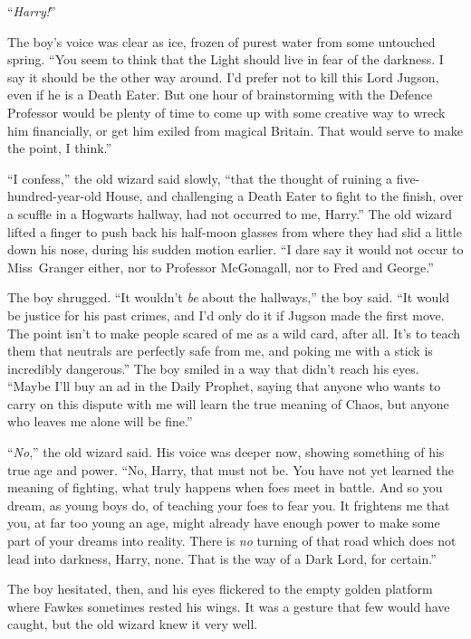 “\emph{Harry!}”

The boy’s voice was clear as ice, frozen of purest water from some untouched spring. “You seem to think that the Light should live in fear of the darkness. I say it should be the other way around. I’d prefer not to kill this Lord Jugson, even if he is a Death Eater. But one hour of brainstorming with the Defence Professor would be plenty of time to come up with some creative way to wreck him financially, or get him exiled from magical Britain. That would serve to make the point, I think.”

“I confess,” the old wizard said slowly, “that the thought of ruining a five-hundred-year-old House, and challenging a Death Eater to fight to the finish, over a scuffle in a Hogwarts hallway, had not occurred to me, Harry.” The old wizard lifted a finger to push back his half-moon glasses from where they had slid a little down his nose, during his sudden motion earlier. “I dare say it would not occur to Miss~Granger either, nor to Professor McGonagall, nor to Fred and George.”

The boy shrugged. “It wouldn’t \emph{be} about the hallways,” the boy said. “It would be justice for his past crimes, and I’d only do it if Jugson made the first move. The point isn’t to make people scared of me as a wild card, after all. It’s to teach them that neutrals are perfectly safe from me, and poking me with a stick is incredibly dangerous.” The boy smiled in a way that didn’t reach his eyes. “Maybe I’ll buy an ad in the Daily Prophet, saying that anyone who wants to carry on this dispute with me will learn the true meaning of Chaos, but anyone who leaves me alone will be fine.”

“\emph{No},” the old wizard said. His voice was deeper now, showing something of his true age and power. “No, Harry, that must not be. You have not yet learned the meaning of fighting, what truly happens when foes meet in battle. And so you dream, as young boys do, of teaching your foes to fear you. It frightens me that you, at far too young an age, might already have enough power to make some part of your dreams into reality. There is \emph{no} turning of that road which does not lead into darkness, Harry, none. That is the way of a Dark Lord, for certain.”

The boy hesitated, then, and his eyes flickered to the empty golden platform where Fawkes sometimes rested his wings. It was a gesture that few would have caught, but the old wizard knew it very well.

